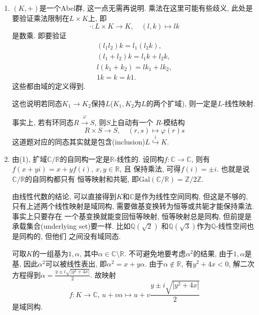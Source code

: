 \begin{solution}
\begin{enumerate}[(1)]
    \item $(K, +)$是一个Abel群, 这一点无需再说明. 乘法在这里可能有些歧义,
    此处是要验证乘法限制在$L \times K$上, 即
    \[
        \cdot: L \times K \to K, \quad (l, k) \mapsto lk
    \]
    是数乘. 即要验证
    \[
    \begin{gathered}
        (l_1l_2)k = l_1(l_2k),\\
        (l_1 + l_2)k = l_1k + l_2k,\\
        l(k_1 + k_2) = lk_1 + lk_2,\\
        1k = k = k1.
    \end{gathered}
    \]
    这些都由域的定义得到.

    这也说明若同态$K_1 \to K_2$保持$L$($K_1, K_2$为$L$的两个扩域),
    则一定是$L$-线性映射.

    事实上, 若有环同态$R \overset{\varphi}\to S$, 则$S$上自动有一个
    $R$-模结构
    \[
        R \times S \to S, \quad (r, s) \mapsto \varphi(r)s
    \]
    这道题对应的同态其实就是包含(inclusion)$L \overset{i}\hookrightarrow K$.
    \item 由(1), 扩域$\mathbb{C}/\mathbb{R}$的自同构一定是$\mathbb{R}$-线性的.
    设同构$f: \mathbb{C} \to \mathbb{C}$, 则有
    $f(x + yi) = x + yf(i),\, x, y \in \mathbb{R}$, 且
    保持乘法, 可得$f(i) = \pm i$. 也就是说$\mathbb{C}/\mathbb{R}$的自同构都只有
    恒等映射和共轭, 即$\mathrm{Gal}(\mathbb{C}/\mathbb{R}) = \mathbb{Z}/2\mathbb{Z}$.

    由线性代数的结论, 可以直接得到$K$和$\mathbb{C}$是作为线性空间同构, 但这是不够的,
    只有上述两个线性映射是域同构, 需要做基变换转为恒等或共轭才能保持乘法. 事实上只要存在
    一个基变换就能变回恒等映射, 恒等映射总是同构,
    但前提是承载集合(underlying set)要一样. 比如$\mathbb{Q}(\sqrt{2})$
    和$\mathbb{Q}(\sqrt{3})$作为$\mathbb{Q}$-线性空间也是同构的, 但他们
    之间没有域同态.

    可取$K$的一组基为$1, \alpha$, 其中$\alpha \in \mathbb{C} \setminus \mathbb{R}$.
    不可避免地要考虑$\alpha^2$的结果, 由于$1, \alpha$是基, 因此$\alpha^2$可以被线性表出,
    即$\alpha^2 = x + y\alpha$. 由于$\alpha \notin \mathbb{R}$, 有$y^2 + 4x < 0$,
    解二次方程得到$\alpha = \frac{y \pm i\sqrt{|y^2 + 4x|}}{2}$.
    故映射
\[
    f: K \to \mathbb{C},\, u + v\alpha \mapsto u + v\frac{y \pm i\sqrt{|y^2 + 4x|}}{2}
\]
    是域同构.
\end{enumerate}
\end{solution}

